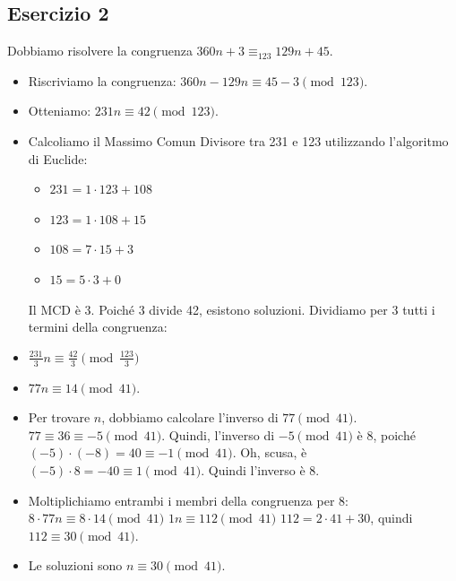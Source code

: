 \subsection*{Esercizio 2}
Dobbiamo risolvere la congruenza $360n+3\equiv_{123}129n+45.$
\begin{itemize}
    \item Riscriviamo la congruenza: $360n - 129n \equiv 45 - 3 \pmod{123}$.
    \item Otteniamo: $231n \equiv 42 \pmod{123}$.
    \item Calcoliamo il Massimo Comun Divisore tra 231 e 123 utilizzando l'algoritmo di Euclide:
    \begin{itemize}
        \item $231 = 1 \cdot 123 + 108$
        \item $123 = 1 \cdot 108 + 15$
        \item $108 = 7 \cdot 15 + 3$
        \item $15 = 5 \cdot 3 + 0$
    \end{itemize}
    Il MCD è 3. Poiché $3$ divide 42, esistono soluzioni. Dividiamo per 3 tutti i termini della congruenza:
    \item $\frac{231}{3}n \equiv \frac{42}{3} \pmod{\frac{123}{3}}$
    \item $77n \equiv 14 \pmod{41}$.
    \item Per trovare $n$, dobbiamo calcolare l'inverso di $77 \pmod{41}$.
    $77 \equiv 36 \equiv -5 \pmod{41}$.
    Quindi, l'inverso di $-5 \pmod{41}$ è $8$, poiché $(-5) \cdot (-8) = 40 \equiv -1 \pmod{41}$. Oh, scusa, è $(-5) \cdot 8 = -40 \equiv 1 \pmod{41}$. Quindi l'inverso è $8$.
    \item Moltiplichiamo entrambi i membri della congruenza per 8:
    $8 \cdot 77n \equiv 8 \cdot 14 \pmod{41}$
    $1n \equiv 112 \pmod{41}$
    $112 = 2 \cdot 41 + 30$, quindi $112 \equiv 30 \pmod{41}$.
    \item Le soluzioni sono $n \equiv 30 \pmod{41}$.

\end{itemize}

